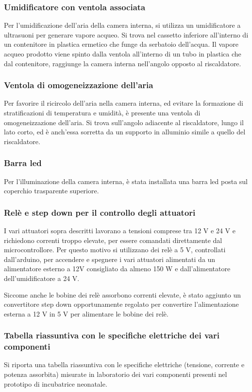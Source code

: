\subsubsection{Umidificatore con ventola associata}
Per l'umidificazione dell'aria della camera interna, si utilizza un umidificatore a ultrasuoni per generare vapore acqueo. Si
trova nel cassetto inferiore all'interno di un contenitore in plastica ermetico che funge da serbatoio dell'acqua. Il vapore
acqueo prodotto viene spinto dalla ventola all'interno di un tubo in plastica che dal contenitore, raggiunge la camera interna
nell'angolo opposto al riscaldatore.

\subsubsection{Ventola di omogeneizzazione dell'aria}
Per favorire il ricircolo dell'aria nella camera interna, ed evitare la formazione di stratificazioni di temperatura e umidità,
è presente una ventola di omogeneizzazione dell'aria. Si trova sull'angolo adiacente al riscaldatore, lungo il lato corto, ed
è anch'essa sorretta da un supporto in alluminio simile a quello del riscaldatore.

\subsubsection{Barra led}
Per l'illuminazione della camera interna, è stata installata una barra led posta sul coperchio trasparente superiore.

\subsubsection{Relè e step down per il controllo degli attuatori}
I vari attuatori sopra descritti lavorano a tensioni comprese tra 12 V e 24 V e richiedono correnti troppo elevate, per essere
comandati direttamente dal microcontrollore. Per questo motivo si utilizzano dei relè a 5 V, controllati dall'arduino, per
accendere e spegnere i vari attuatori alimentati da un alimentatore esterno a 12V consigliato da almeno 150 W e dall'alimentatore
dell'umidificatore a 24 V.

Siccome anche le bobine dei relè assorbono correnti elevate, è stato aggiunto un convertitore step down opportunamente regolato
per convertire l'alimentazione esterna a 12 V in 5 V per alimentare le bobine dei relè.

\subsubsection{Tabella riassuntiva con le specifiche elettriche dei vari componenti}
Si riporta una tabella riassuntiva con le specifiche elettriche (tensione, corrente e potenza assorbita) misurate in laboratorio
dei vari componenti presenti nel prototipo di incubatrice neonatale.

